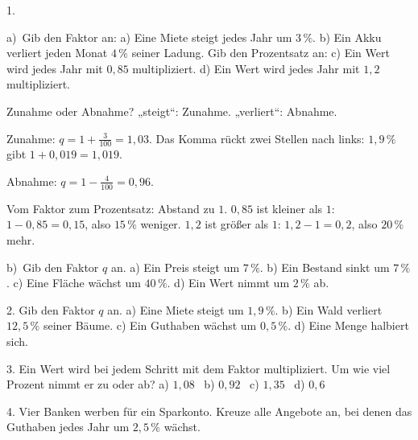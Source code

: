 \documentclass[11pt]{article}
\newcommand{\kennung}{SLM}
\newcommand{\grau}[1]{{\color{mbgrau}#1}}
\begin{document}
\pfheftstil
\fancyfoot[C]{\parbox[t]{\textwidth}{\mbfhbox\par\vspace{1.5mm}{\footnotesize\color{mbgrau}{\scriptsize \kennung}\hfill\thepage}}}
\begin{pfaufg}{}{1.}{}
\grau{a)\ Gib den Faktor an: a) Eine Miete steigt jedes Jahr um $3\,\%$. b) Ein Akku verliert jeden Monat $4\,\%$ seiner Ladung. Gib den Prozentsatz an: c) Ein Wert wird jedes Jahr mit $0{,}85$ multipliziert. d) Ein Wert wird jedes Jahr mit $1{,}2$ multipliziert.\par\smallskip Zunahme oder Abnahme? „steigt“: Zunahme. „verliert“: Abnahme.\par Zunahme: $q = 1 + \frac{3}{100} = 1{,}03$. Das Komma rückt zwei Stellen nach links: $1{,}9\,\%$ gibt $1 + 0{,}019 = 1{,}019$.\par Abnahme: $q = 1 - \frac{4}{100} = 0{,}96$.\par Vom Faktor zum Prozentsatz: Abstand zu $1$. $0{,}85$ ist kleiner als $1$: $1 - 0{,}85 = 0{,}15$, also $15\,\%$ weniger. $1{,}2$ ist größer als $1$: $1{,}2 - 1 = 0{,}2$, also $20\,\%$ mehr.}
\par\medskip
b)\ Gib den Faktor $q$ an. a) Ein Preis steigt um $7\,\%$. b) Ein Bestand sinkt um $7\,\%$. c) Eine Fläche wächst um $40\,\%$. d) Ein Wert nimmt um $2\,\%$ ab.
\end{pfaufg}

\begin{pfaufg}{}{2.}{}
Gib den Faktor $q$ an. a) Eine Miete steigt um $1{,}9\,\%$. b) Ein Wald verliert $12{,}5\,\%$ seiner Bäume. c) Ein Guthaben wächst um $0{,}5\,\%$. d) Eine Menge halbiert sich.
\end{pfaufg}

\begin{pfaufg}{}{3.}{}
Ein Wert wird bei jedem Schritt mit dem Faktor multipliziert. Um wie viel Prozent nimmt er zu oder ab? a) $1{,}08$ \ b) $0{,}92$ \ c) $1{,}35$ \ d) $0{,}6$
\end{pfaufg}

\begin{pfaufg}{}{4.}{}
Vier Banken werben für ein Sparkonto. Kreuze alle Angebote an, bei denen das Guthaben jedes Jahr um $2{,}5\,\%$ wächst.\par\smallskip {}\par {}
\end{pfaufg}
\end{document}
